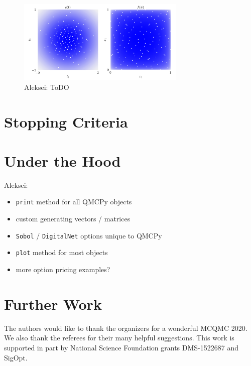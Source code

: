 \documentclass[graybox,footinfo]{svmult}
\newcommand{\AGSComment}[1]{{\color{cyan} Aleksei: #1}}
\begin{document}
\begin{figure}
	\includegraphics[height=4cm]{ags/figs/i.keister_contours.png}
	\caption{\AGSComment{ToDO}} \label{fig:ikc}
\end{figure}

\section{Stopping Criteria}





\section{Under the Hood}

\AGSComment{
\begin{itemize}
    \item \texttt{print} method for all QMCPy objects
    \item custom generating vectors / matrices
    \item \texttt{Sobol} / \texttt{DigitalNet} options unique to QMCPy
    \item \texttt{plot} method for most objects
    \item more option pricing examples? 
\end{itemize}}

\section{Further Work} \label{sec:further}


\begin{acknowledgement}
The authors would like to thank the organizers for a wonderful MCQMC 2020. 
We also thank the referees for their many helpful suggestions.  This work is supported in part by National Science Foundation grants DMS-1522687 and SigOpt.


\end{acknowledgement}



\end{document}

